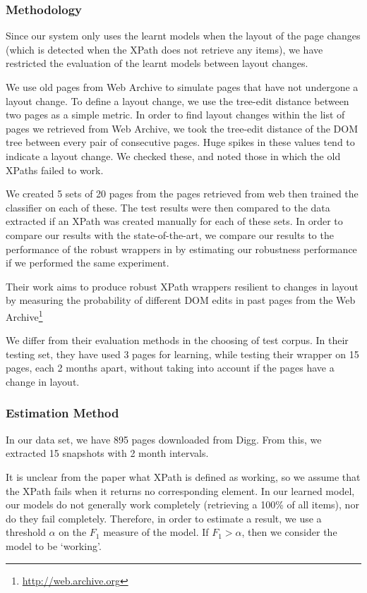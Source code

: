 \documentclass[a4paper,12pt]{nurop}
\begin{document}
\subsubsection{Methodology}
	Since our system only uses the learnt models when the layout of the page changes (which is 
detected when the XPath does not retrieve any items), we have restricted the evaluation of 
the learnt models between layout changes.

	We use old pages from Web Archive to simulate pages that have not
undergone a layout change. To define a layout change, we use the tree-edit distance \cite{Zhang1989} between two pages as
a simple metric. In order to find layout changes within the list of pages we retrieved from Web
Archive, we took the tree-edit distance of the DOM tree between every pair of consecutive pages.
Huge spikes in these values tend to indicate a layout change. We checked these, and noted those
in which the old XPaths failed to work.

 We created 5 sets of 20 pages from the pages retrieved from web
then trained the classifier on each of these. The test results were then compared to the data
extracted if an XPath was created manually for each of these sets.
In order to compare our results with the state-of-the-art, we compare our results to the performance of the robust wrappers
in \cite{Dalvi2009} by estimating our robustness performance if we performed the same experiment.

Their work aims to produce robust XPath wrappers resilient to changes 
in layout by measuring the probability of different DOM edits in past pages
from the Web Archive\footnote{\url{http://web.archive.org}}

We differ from their evaluation methods in the choosing of test corpus. In their testing
set, they have used 3 pages for learning, while testing their wrapper on 15 pages,
each 2 months apart, without taking into account if the pages have a change in layout.
\subsubsection{Estimation Method}
In our data set, we have 895 pages downloaded from Digg. From this, we extracted 15 snapshots
with 2 month intervals.

It is unclear from the paper what XPath is defined as working, so we assume that
the XPath fails when it returns no corresponding element. In our learned model,
our models do not generally work completely (retrieving a 100\% of all items),
nor do they fail completely. Therefore, in order to estimate a result, we use 
a threshold $\alpha$ on the $F_1$ measure of the model. If $F_1 > \alpha$,
then we consider the model to be `working'.
\end{document}
